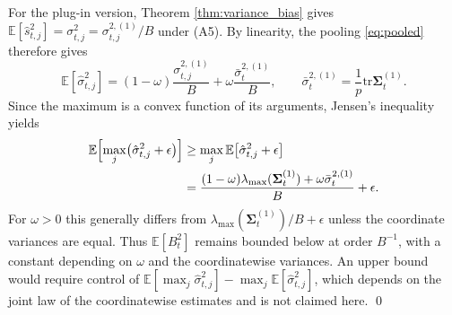 \documentclass[a4paper,fleqn]{cas-dc}
\theoremstyle{plain}
\theoremstyle{definition}
\theoremstyle{remark}
\newcommand{\tr}{\mathrm{tr}}
\newcommand{\E}{\mathbb{E}}
\begin{document}
\begin{appendices}
For the plug-in version, Theorem \ref{thm:variance_bias} gives $\E[\hat s^2_{t,j}]=\sigma^2_{t,j}=\sigma^{2,(1)}_{t,j}/B$ under (A5). By linearity, the pooling \eqref{eq:pooled} therefore gives
\begin{equation}
\E[\hat\sigma^2_{t,j}]
=(1-\omega)\frac{\sigma^{2,(1)}_{t,j}}{B}
+\omega\frac{\bar\sigma_t^{2,(1)}}{B},
\qquad
\bar\sigma_t^{2,(1)}=\frac1p\tr\bm\Sigma_t^{(1)}.
\end{equation}
Since the maximum is a convex function of its arguments, Jensen's inequality yields
\begin{equation}
\begin{split}
\E\Bigl[\max_j\bigl(\hat\sigma^2_{t,j}+\epsilon\bigr)\Bigr]
&\ge \max_j\E\bigl[\hat\sigma^2_{t,j}+\epsilon\bigr]\\
&=\frac{(1-\omega)\lambda_{\max}(\bm\Sigma_t^{(1)})+\omega\bar\sigma_t^{2,(1)}}{B}+\epsilon.
\end{split}
\end{equation}
For $\omega>0$ this generally differs from $\lambda_{\max}(\bm\Sigma_t^{(1)})/B+\epsilon$ unless the coordinate variances are equal. Thus $\E[B^2_t]$ remains bounded below at order $B^{-1}$, with a constant depending on $\omega$ and the coordinatewise variances. An upper bound would require control of $\E[\max_j\hat\sigma^2_{t,j}]-\max_j\E[\hat\sigma^2_{t,j}]$, which depends on the joint law of the coordinatewise estimates and is not claimed here. \qed

\end{appendices}






\end{document}
